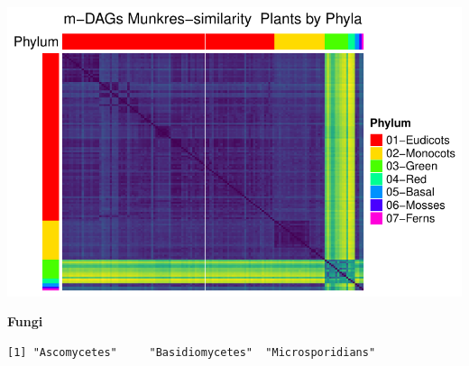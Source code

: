 \documentclass[
  letterpaper,
  DIV=11,
  numbers=noendperiod]{scrreprt}
\newenvironment{Shaded}{}{}
\newcommand{\FunctionTok}[1]{\textcolor[rgb]{0.38,0.69,0.94}{#1}}
\newcommand{\NormalTok}[1]{\textcolor[rgb]{0.67,0.70,0.75}{#1}}
\newcommand{\OtherTok}[1]{\textcolor[rgb]{0.15,0.68,0.38}{#1}}
\newcommand{\SpecialCharTok}[1]{\textcolor[rgb]{0.34,0.71,0.76}{#1}}
\newcommand{\StringTok}[1]{\textcolor[rgb]{0.60,0.76,0.47}{#1}}
\begin{document}
\includegraphics[width=1\textwidth,height=\textheight]{appendix_files/figure-pdf/unnamed-chunk-10-2.pdf}

\textbf{Fungi}

\begin{Shaded}
\end{Shaded}

\begin{verbatim}
[1] "Ascomycetes"     "Basidiomycetes"  "Microsporidians"
\end{verbatim}
\end{document}
